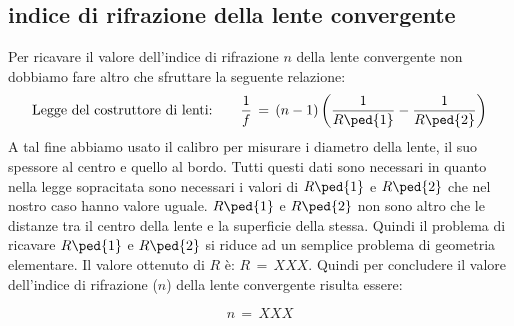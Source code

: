 \subsection{indice di rifrazione della lente convergente}

Per ricavare il valore dell'indice di rifrazione $n$ della lente convergente non dobbiamo fare altro che sfruttare la seguente relazione:
\begin{equation}
	\text{Legge del costruttore di lenti:} \qquad \frac{1}{f} \,=\, (n-1)\left(\frac{1}{R\ped{1}}-\frac{1}{R\ped{2}}\right)
	\label{eq:costruttore}
\end{equation}
A tal fine abbiamo usato il calibro per misurare i diametro della lente, il suo spessore al centro e quello al bordo. Tutti questi dati sono necessari in quanto nella legge sopracitata sono necessari i valori di $R\ped{1}$ e $R\ped{2}$ che nel nostro caso hanno valore uguale. $R\ped{1}$ e $R\ped{2}$ non sono altro che le distanze tra il centro della lente e la superficie della stessa. Quindi il problema di ricavare $R\ped{1}$ e $R\ped{2}$ si riduce ad un semplice problema di geometria elementare.
Il valore ottenuto di $R$ è: $R \,=\, XXX$.
Quindi per concludere il valore dell'indice di rifrazione ($n$) della lente convergente risulta essere:

\begin{equation}
	n \,=\, XXX
\end{equation}







